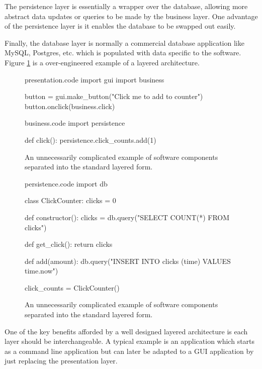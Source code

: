 The persistence layer is essentially a wrapper over the database, allowing more abstract data updates or queries to be made by the business layer.
One advantage of the persistence layer is it enables the database to be swapped out easily.

Finally, the database layer is normally a commercial database application like MySQL, Postgres, etc. which is populated with data specific to the software.
Figure \ref{fig:standard-form-example} is a over-engineered example of a layered architecture.

\begin{figure}[H]
\begin{code}[style=python]{presentation.code}
import gui
import business

button = gui.make_button("Click me to add to counter")
button.onclick(business.click)
\end{code}

\begin{code}[style=python]{business.code}
import persistence

def click():
    persistence.click_counts.add(1)
\end{code}
\caption{An unnecessarily complicated example of software components separated into the standard layered form.}
\label{fig:standard-form-example}
\end{figure}

\begin{figure}[H]
\ContinuedFloat
\begin{code}[style=python]{persistence.code}
import db

class ClickCounter:
    clicks = 0

    def constructor():
        clicks = db.query("SELECT COUNT(*) FROM clicks")

    def get_click():
        return clicks

    def add(amount):
        db.query("INSERT INTO clicks (time) VALUES {{time.now}}")

click_counts = ClickCounter()
\end{code}
\caption{An unnecessarily complicated example of software components separated into the standard layered form.}
\end{figure}

One of the key benefits afforded by a well designed layered architecture is each layer should be interchangeable.
A typical example is an application which starts as a command line application but can later be adapted to a GUI application by just replacing the presentation layer.


